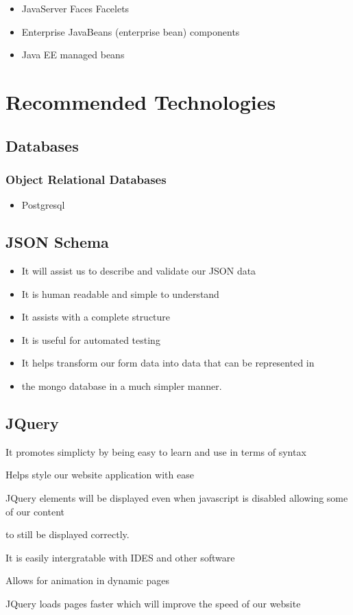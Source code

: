 \begin{itemize}
	\item JavaServer Faces Facelets
\end{itemize}

\begin{itemize}
	\item Enterprise JavaBeans (enterprise bean) components
\end{itemize}

\begin{itemize}
	\item Java EE managed beans
\end{itemize}


\section{Recommended Technologies}
\subsection{Databases}
\subsubsection{Object Relational Databases}
\begin{itemize}
	\item Postgresql
\end{itemize}


\subsection{JSON Schema}
\begin{itemize}
	\item It will assist us to describe and validate our JSON data
	\item It is human readable and simple to understand
	\item It assists with a complete structure
	\item It is useful for automated testing
	\item It helps transform our form data into data that can be represented in
	\item the mongo database in a much simpler manner.
\end{itemize}

\subsection{JQuery}
\item It promotes simplicty by being easy to learn and use in terms of syntax 
\item Helps style our website application with ease
\item JQuery elements will be displayed even when javascript is disabled allowing some of our content\item to still be displayed correctly.
\item It is easily intergratable with IDES and other software
\item Allows for animation in dynamic pages
\item JQuery loads pages faster which will improve the speed of our website

